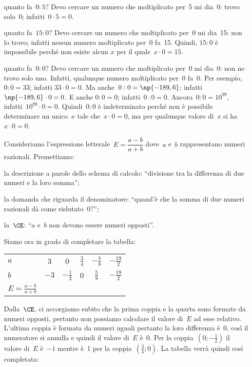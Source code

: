 \begin{itemize*}
 \item quanto fa~$0:5$? Devo cercare un numero che moltiplicato per~5 mi dia~0: trovo solo~0; infatti~$0\cdot 5=0$.
 \item quanto fa~$15:0$? Devo cercare un numero che moltiplicato per~0 mi dia~15:
non lo trovo; infatti nessun numero moltiplicato per~0 fa~15. Quindi,
$15:0$ è impossibile perché non esiste alcun
$x$ per il quale~$x\cdot 0=15$.
 \item quanto fa~$0:0$? Devo cercare un numero che moltiplicato per~0 mi dia~0:
non ne trovo solo uno. Infatti, qualunque numero moltiplicato per~0
fa~0. Per esempio, $0:0=33$; infatti
$33\cdot 0=0$. Ma anche~$0:0=\np{-189,6}$;
infatti~$\np{-189,6}\cdot 0=0$. E anche $0:0=0$;
infatti~$0\cdot 0=0$. 
Ancora~$0:0=10^{99}$, infatti~$10^{99}\cdot 0=0$.
Quindi~$0:0$ è indeterminato perché
non è possibile determinare un unico~$x$ tale che~$x\cdot 0=0$,
ma per qualunque valore di~$x$ si ha~$x\cdot 0=0$.
\end{itemize*}

Consideriamo l'espressione letterale~$E=\dfrac{a-b}{a+b}$ dove~$a$ e~$b$ 
rappresentano numeri razionali.
Premettiamo:

\begin{enumeratea}
 \item la descrizione a parole dello schema di calcolo:
``divisione tra la differenza di due numeri e la loro
somma'';
 \item la domanda che riguarda il denominatore: ``quand'è che la somma di
due numeri razionali dà come rislutato~0?'';
 \item la~$\CE$: ``$a$ e~$b$ non devono essere numeri opposti''.
\end{enumeratea}

Siamo ora in grado di completare la tabella:
\begin{center}
\begin{tabular*}{.8\textwidth}{l@{\extracolsep{\fill}}*{5}{c}}
\toprule
$a$ & 3 &0 & $\frac{3}{4}$ &$-{\frac{5}{8}}$ & $-{\frac{19}{2}}$ \\
$b$ & $-3$ & $-{\frac{1}{2}}$ & 0 &$\frac{5}{8}$ & $-{\frac{19}{2}}$ \\
\midrule
$E=\frac{a-b}{a+b}$ & & & & &\\
\bottomrule
\end{tabular*}
\end{center}

Dalla~$\CE$, ci accorgiamo subito che la
prima coppia e la quarta sono formate da numeri opposti, pertanto non
possiamo calcolare il valore di~$E$ ad esse relativo. L'ultima
coppia è formata da numeri uguali pertanto la loro differenza è~0, così
il numeratore si annulla e quindi il valore di~$E$ è~0. 
Per la coppia~$\left(0;-\frac{1}{2}\right)$ il valore di~$E$ è~$-1$ mentre è~1 per
la coppia~$\left(\frac{3}{4};0\right)$.
La tabella verrà quindi così completata:

